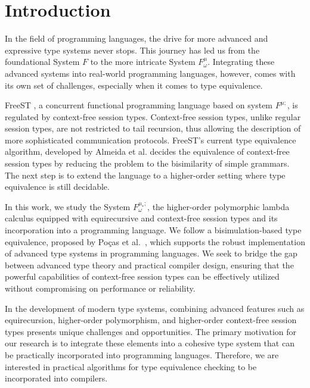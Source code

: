 \section{Introduction}\label{sec:intro}
In the field of programming languages, the drive for more advanced and expressive type systems never stops. This journey has led us from the foundational System $F$\cite{DBLP:conf/programm/Reynolds74} to the more intricate System $F^{\mu}_\omega$\cite{DBLP:conf/popl/CaiGO16}. Integrating these advanced systems into real-world programming languages, however, comes with its own set of challenges, especially when it comes to type equivalence.

FreeST \cite{AlmeidaMTV22}, a concurrent functional programming language based on system $F^{\mu;}$, is regulated by context-free session types. Context-free session types, unlike regular session types, are not restricted to tail recursion, thus allowing the description of more sophisticated communication protocols. FreeST's current type equivalence algorithm, developed by Almeida et al. \cite{AlmeidaMV20} decides the equivalence of context-free session types by reducing the problem to the bisimilarity of simple grammars. The next step is to extend the language to a higher-order setting where type equivalence is still decidable.


In this work, we study the System $F^{\mu_*;}_\omega$, the higher-order polymorphic lambda calculus equipped with equirecursive and context-free session types and its incorporation into a programming language. We follow a bisimulation-based type equivalence, proposed by Poças et al.~\cite{DBLP:conf/esop/PocasCMV23}, which supports the robust implementation of advanced type systems in programming languages. We seek to bridge the gap between advanced type theory and practical compiler design, ensuring that the powerful capabilities of context-free session types can be effectively utilized without compromising on performance or reliability.

In the development of modern type systems, combining advanced features such as equirecursion, higher-order polymorphism, and higher-order context-free session types presents unique challenges and opportunities. The primary motivation for our research is to integrate these elements into a cohesive type system that can be practically incorporated into programming languages. Therefore, we are interested in practical algorithms for type equivalence checking to be incorporated into compilers.

